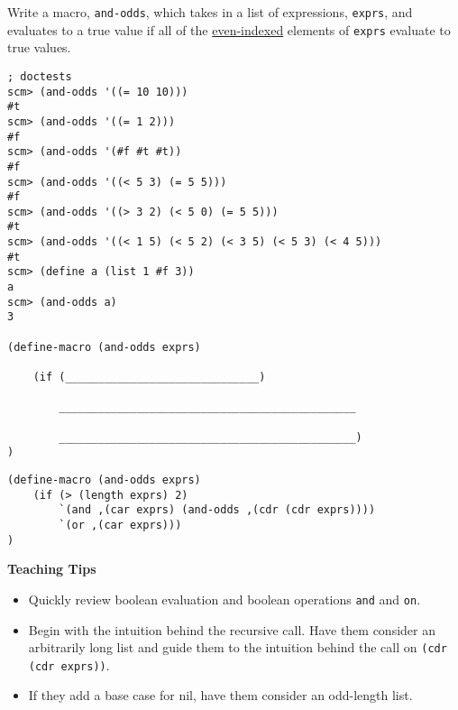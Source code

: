 \question
Write a macro, \lstinline{and-odds}, which takes in a list of expressions, \lstinline{exprs}, and evaluates to a true value if all of the \underline{even-indexed} elements of \lstinline{exprs} evaluate to true values.

\begin{lstlisting}
; doctests
scm> (and-odds '((= 10 10)))
#t
scm> (and-odds '((= 1 2)))
#f
scm> (and-odds '(#f #t #t))
#f
scm> (and-odds '((< 5 3) (= 5 5)))
#f
scm> (and-odds '((> 3 2) (< 5 0) (= 5 5)))
#t
scm> (and-odds '((< 1 5) (< 5 2) (< 3 5) (< 5 3) (< 4 5)))
#t
scm> (define a (list 1 #f 3))
a
scm> (and-odds a)
3

(define-macro (and-odds exprs)

    (if (______________________________)

        ______________________________________________

        ______________________________________________)
)
\end{lstlisting}

\begin{solution}
\begin{lstlisting}
(define-macro (and-odds exprs)
    (if (> (length exprs) 2)
        `(and ,(car exprs) (and-odds ,(cdr (cdr exprs))))
        `(or ,(car exprs)))
)
\end{lstlisting}
\end{solution}

\begin{blocksection}
\begin{guide}
\textbf{Teaching Tips}
\begin{itemize}
	\item Quickly review boolean evaluation and boolean operations \lstinline{and} and \lstinline{on}.
	\item Begin with the intuition behind the recursive call. Have them consider an arbitrarily long list and guide them to the intuition behind the call on \lstinline{(cdr (cdr exprs))}.
	\item If they add a base case for nil, have them consider an odd-length list.
\end{itemize}
\end{guide}
\end{blocksection}
